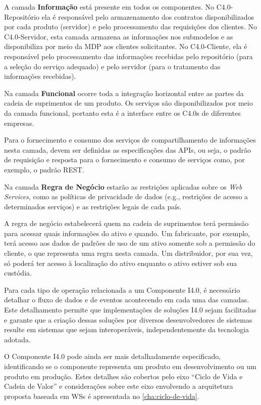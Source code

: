 A camada \textbf{Informação} está presente em todos os componentes. No C4.0-Repositório ela é responsável pelo armazenamento dos contratos disponibilizados por cada produto (servidor) e pelo processamento das requisições dos clientes. No C4.0-Servidor, esta camada armazena as informações nos submodelos e as disponibiliza por meio da MDP aos clientes solicitantes. No C4.0-Cliente, ela é responsável pelo processamento das informações recebidas pelo repositório (para a seleção do serviço adequado) e pelo servidor (para o tratamento das informações recebidas).

Na camada \textbf{Funcional} ocorre toda a integração horizontal entre as partes da cadeia de suprimentos de um produto. Os serviços são disponibilizados por meio da camada funcional, portanto esta é a interface entre os C4.0s de diferentes empresas.

Para o fornecimento e consumo dos serviços de compartilhamento de informações nesta camada, devem ser definidas as especificações das APIs, ou seja, o padrão de requisição e resposta para o fornecimento e consumo de serviços como, por exemplo, o padrão REST.

Na camada \textbf{Regra de Negócio} estarão as restrições aplicadas sobre os \textit{Web Services}, como as políticas de privacidade de dados (e.g., restrições de acesso a determinados serviços) e as restrições legais de cada país.

A regra de negócio estabelecerá quem na cadeia de suprimentos terá permissão para acessar quais informações do ativo e quando. Um fabricante, por exemplo, terá acesso aos dados de padrões de uso de um ativo somente sob a permissão do cliente, o que representa uma regra nesta camada. Um distribuidor, por sua vez, só poderá ter acesso à localização do ativo enquanto o ativo estiver sob sua custódia.

Para cada tipo de operação relacionada a um Componente I4.0, é necessário detalhar o fluxo de dados e de eventos acontecendo em cada uma das camadas. Este detalhamento permite que implementações de soluções I4.0 sejam facilitadas e garante que a criação dessas soluções por diversos desenvolvedores de sistemas resulte em sistemas que sejam interoperáveis, independentemente da tecnologia adotada.

O Componente I4.0 pode ainda ser mais detalhadamente especificado, identificando se o componente representa um produto em desenvolvimento ou um produto em produção. Estes detalhes são cobertos pelo eixo ``Ciclo de Vida e Cadeia de Valor'' e considerações sobre este eixo envolvendo a arquitetura proposta baseada em WSs é apresentada no \autoref{cha:ciclo-de-vida}.


